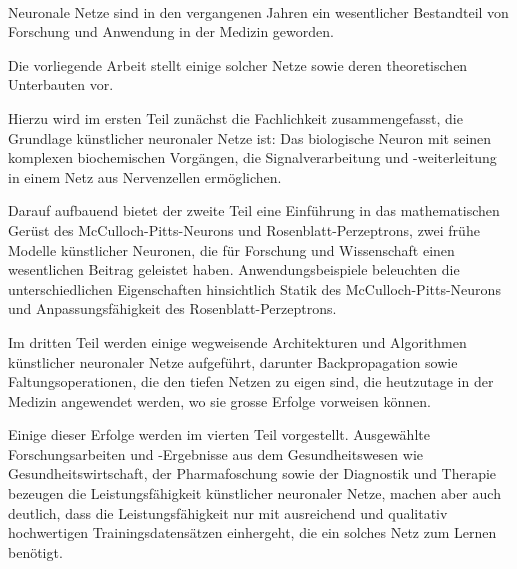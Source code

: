 \kurzfassung

\paragraph*{}

Neuronale Netze sind in den vergangenen Jahren ein wesentlicher Bestandteil von Forschung und Anwendung in der Medizin geworden.

Die vorliegende Arbeit stellt einige solcher Netze sowie deren theoretischen Unterbauten vor.

Hierzu wird im ersten Teil zunächst die Fachlichkeit zusammengefasst, die Grundlage künstlicher neuronaler Netze ist: Das biologische Neuron mit seinen komplexen biochemischen Vorgängen, die Signalverarbeitung und -weiterleitung in einem Netz aus Nervenzellen ermöglichen.

Darauf aufbauend bietet der zweite Teil eine Einführung in das mathematischen Gerüst des McCulloch-Pitts-Neurons und Rosenblatt-Perzeptrons, zwei frühe Modelle künstlicher Neuronen, die für Forschung und Wissenschaft einen wesentlichen Beitrag geleistet haben.
Anwendungsbeispiele beleuchten die unterschiedlichen Eigenschaften hinsichtlich Statik des McCulloch-Pitts-Neurons und Anpassungsfähigkeit des Rosenblatt-Perzeptrons.

Im dritten Teil werden einige wegweisende Architekturen und Algorithmen künstlicher neuronaler Netze aufgeführt, darunter  Backpropagation sowie Faltungsoperationen, die den tiefen Netzen zu eigen sind, die heutzutage in der Medizin angewendet werden, wo sie grosse Erfolge vorweisen können.

Einige dieser Erfolge werden im vierten Teil vorgestellt.
Ausgewählte Forschungsarbeiten und -Ergebnisse aus dem Gesundheitswesen wie Gesundheitswirtschaft, der Pharmafoschung sowie der Diagnostik und Therapie bezeugen die Leistungsfähigkeit künstlicher neuronaler Netze, machen aber auch deutlich, dass die Leistungsfähigkeit nur mit ausreichend und qualitativ hochwertigen Trainingsdatensätzen einhergeht, die ein solches Netz zum Lernen benötigt.

